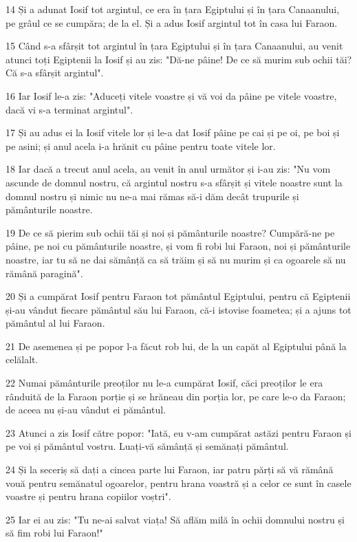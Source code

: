 \par 14 Și a adunat Iosif tot argintul, ce era în țara Egiptului și în țara Canaanului, pe grâul ce se cumpăra; de la el. Și a adus Iosif argintul tot în casa lui Faraon.
\par 15 Când s-a sfârșit tot argintul în țara Egiptului și în țara Canaanului, au venit atunci toți Egiptenii la Iosif și au zis: "Dă-ne pâine! De ce să murim sub ochii tăi? Că s-a sfârșit argintul".
\par 16 Iar Iosif le-a zis: "Aduceți vitele voastre și vă voi da pâine pe vitele voastre, dacă vi s-a terminat argintul".
\par 17 Și au adus ei la Iosif vitele lor și le-a dat Iosif pâine pe cai și pe oi, pe boi și pe asini; și anul acela i-a hrănit cu pâine pentru toate vitele lor.
\par 18 Iar dacă a trecut anul acela, au venit în anul următor și i-au zis: "Nu vom ascunde de domnul nostru, că argintul nostru s-a sfârșit și vitele noastre sunt la domnul nostru și nimic nu ne-a mai rămas să-i dăm decât trupurile și pământurile noastre.
\par 19 De ce să pierim sub ochii tăi și noi și pământurile noastre? Cumpără-ne pe pâine, pe noi cu pământurile noastre, și vom fi robi lui Faraon, noi și pământurile noastre, iar tu să ne dai sămânță ca să trăim și să nu murim și ca ogoarele să nu rămână paragină".
\par 20 Și a cumpărat Iosif pentru Faraon tot pământul Egiptului, pentru că Egiptenii și-au vândut fiecare pământul său lui Faraon, că-i istovise foametea; și a ajuns tot pământul al lui Faraon.
\par 21 De asemenea și pe popor l-a făcut rob lui, de la un capăt al Egiptului până la celălalt.
\par 22 Numai pământurile preoților nu le-a cumpărat Iosif, căci preoților le era rânduită de la Faraon porție și se hrăneau din porția lor, pe care le-o da Faraon; de aceea nu și-au vândut ei pământul.
\par 23 Atunci a zis Iosif către popor: "Iată, eu v-am cumpărat astăzi pentru Faraon și pe voi și pământul vostru. Luați-vă sămânță și semănați pământul.
\par 24 Și la seceriș să dați a cincea parte lui Faraon, iar patru părți să vă rămână vouă pentru semănatul ogoarelor, pentru hrana voastră și a celor ce sunt în casele voastre și pentru hrana copiilor voștri".
\par 25 Iar ei au zis: "Tu ne-ai salvat viața! Să aflăm milă în ochii domnului nostru și să fim robi lui Faraon!"
